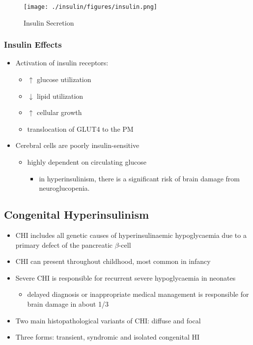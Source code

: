 \documentclass{scrartcl}
\begin{document}
\begin{figure}[htbp]
\centering
\texttt{[image: ./insulin/figures/insulin.png]}
\caption[insulin]{\label{fig:org26b83cb}
Insulin Secretion}
\end{figure}

\subsubsection{Insulin Effects}
\label{sec:orge7f659b}
\begin{itemize}
\item Activation of insulin receptors:
\begin{itemize}
\item \(\uparrow\) glucose utilization
\item \(\downarrow\) lipid utilization
\item \(\uparrow\) cellular growth
\item translocation of GLUT4 to the PM
\end{itemize}
\item Cerebral cells are poorly insulin-sensitive
\begin{itemize}
\item highly dependent on circulating glucose
\begin{itemize}
\item in hyperinsulinism, there is a significant risk of brain damage
from neuroglucopenia.
\end{itemize}
\end{itemize}
\end{itemize}

\subsection{Congenital Hyperinsulinism}
\label{sec:orgea2cfb7}
\begin{itemize}
\item CHI includes all genetic causes of hyperinsulinaemic
hypoglycaemia due to a primary defect of the pancreatic
\(\beta\)-cell
\item CHI can present throughout childhood, most common in infancy
\item Severe CHI is responsible for recurrent severe hypoglycaemia in neonates
\begin{itemize}
\item delayed diagnosis or inappropriate medical management is responsible for brain damage in about 1/3
\end{itemize}
\item Two main histopathological variants of CHI: diffuse and focal
\item Three forms: transient, syndromic and isolated congenital HI
\end{itemize}
\end{document}

